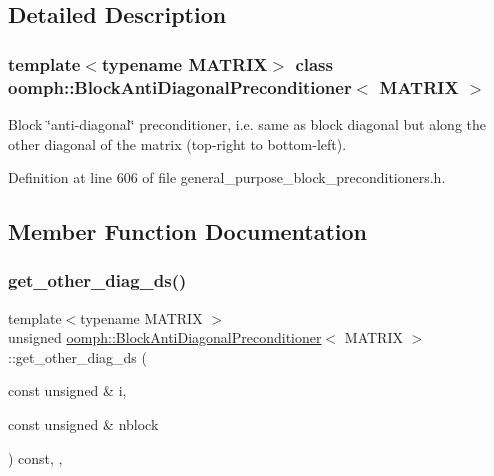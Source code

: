 \subsection{Detailed Description}
\subsubsection*{template$<$typename M\+A\+T\+R\+IX$>$\newline
class oomph\+::\+Block\+Anti\+Diagonal\+Preconditioner$<$ M\+A\+T\+R\+I\+X $>$}

Block \char`\"{}anti-\/diagonal\char`\"{} preconditioner, i.\+e. same as block diagonal but along the other diagonal of the matrix (top-\/right to bottom-\/left). 

Definition at line 606 of file general\+\_\+purpose\+\_\+block\+\_\+preconditioners.\+h.



\subsection{Member Function Documentation}
\mbox{\label{classoomph_1_1BlockAntiDiagonalPreconditioner_a880a182c7aca041992146d559c109fdb}} 
\subsubsection{\texorpdfstring{get\+\_\+other\+\_\+diag\+\_\+ds()}{get\_other\_diag\_ds()}}
{\footnotesize\ttfamily template$<$typename M\+A\+T\+R\+IX $>$ \\
unsigned \hyperlink{classoomph_1_1BlockAntiDiagonalPreconditioner}{oomph\+::\+Block\+Anti\+Diagonal\+Preconditioner}$<$ M\+A\+T\+R\+IX $>$\+::get\+\_\+other\+\_\+diag\+\_\+ds (\begin{DoxyParamCaption}\item[{const unsigned \&}]{i,  }\item[{const unsigned \&}]{nblock }\end{DoxyParamCaption}) const\hspace{0.3cm}{\ttfamily [inline]}, {\ttfamily [protected]}, {\ttfamily [virtual]}}

